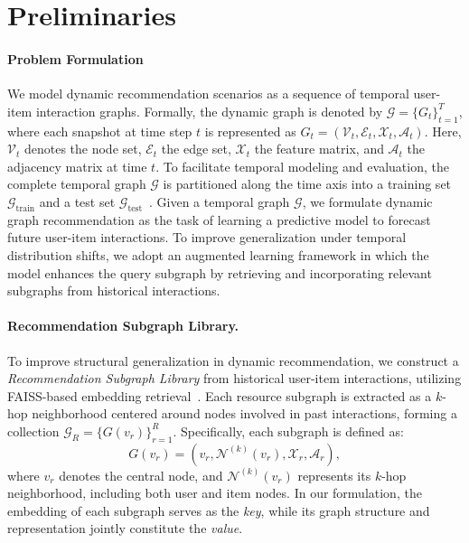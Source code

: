 \documentclass[letterpaper]{article} %
\begin{document}
\section{Preliminaries}
\paragraph{Problem Formulation}
We model dynamic recommendation scenarios as a sequence of temporal user-item interaction graphs. Formally, the dynamic graph is denoted by $\mathcal{G} = \{G_t\}_{t=1}^T$, where each snapshot at time step $t$ is represented as $G_t = (\mathcal{V}_t, \mathcal{E}_t, \mathcal{X}_t, \mathcal{A}_t)$. Here, $\mathcal{V}_t$ denotes the node set, $\mathcal{E}_t$ the edge set, $\mathcal{X}_t$ the feature matrix, and $\mathcal{A}_t$ the adjacency matrix at time $t$. To facilitate temporal modeling and evaluation, the complete temporal graph $\mathcal{G}$ is partitioned along the time axis into a training set $\mathcal{G}_{\text{train}}$ and a test set $\mathcal{G}_{\text{test}}$~\cite{jiang2024ragraph}.
Given a temporal graph $\mathcal{G}$, we formulate dynamic graph recommendation as the task of learning a predictive model to forecast future user-item interactions. To improve generalization under temporal distribution shifts, we adopt an augmented learning framework in which the model enhances the query subgraph by retrieving and incorporating relevant subgraphs from historical interactions. 

\paragraph{Recommendation Subgraph Library.}
To improve structural generalization in dynamic recommendation, we construct a \textit{Recommendation Subgraph Library} from historical user-item interactions, utilizing FAISS-based embedding retrieval~\cite{douze2024faiss}. Each resource subgraph is extracted as a $k$-hop neighborhood centered around nodes involved in past interactions, forming a collection $\mathcal{G}_R = \{G(v_r)\}_{r=1}^{R}$. Specifically, each subgraph is defined as:
\begin{equation}
G(v_r) = \left(v_r, \mathcal{N}^{(k)}(v_r), \mathcal{X}_r, \mathcal{A}_r \right),
\end{equation}
where $v_r$ denotes the central node, and $\mathcal{N}^{(k)}(v_r)$ represents its $k$-hop neighborhood, including both user and item nodes. In our formulation, the embedding of each subgraph serves as the \emph{key}, while its graph structure and representation jointly constitute the \emph{value}.
\end{document}
